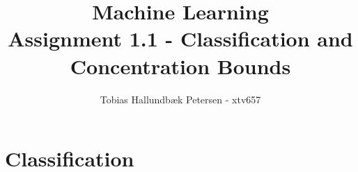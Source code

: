 \documentclass[a4paper]{article}
\title{Machine Learning\\Assignment 1.1 - Classification and Concentration Bounds}
\author{Tobias Hallundbæk Petersen - xtv657}
\begin{document}
\maketitle
\section{Classification}
\end{document}

